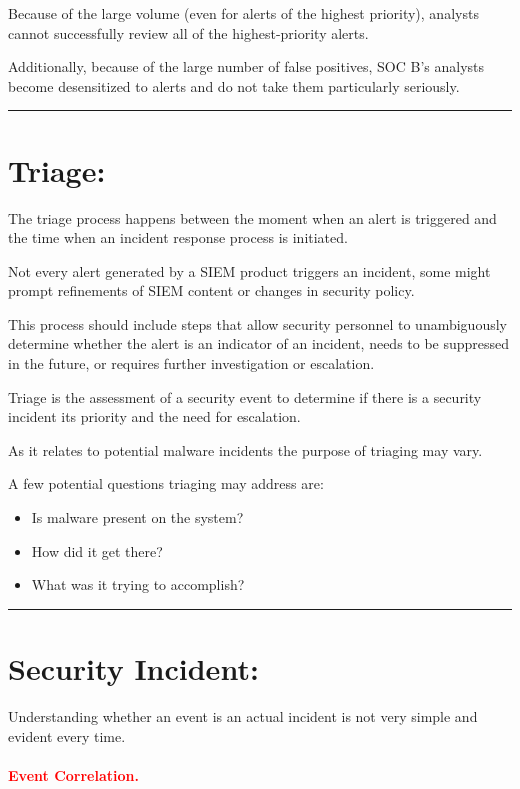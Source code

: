 \documentclass[british]{article}
\begin{document}
Because of the large volume (even for alerts of the highest priority),
analysts cannot successfully review all of the highest-priority alerts.

Additionally, because of the large number of false positives, SOC
B's analysts become desensitized to alerts and do not take them particularly
seriously.

\rule[0.5ex]{0.75\columnwidth}{1pt}

\section{Triage:}

The triage process happens between the moment when an alert is triggered
and the time when an incident response process is initiated.

Not every alert generated by a SIEM product triggers an incident,
some might prompt refinements of SIEM content or changes in security
policy.

This process should include steps that allow security personnel to
unambiguously determine whether the alert is an indicator of an incident,
needs to be suppressed in the future, or requires further investigation
or escalation.

Triage is the assessment of a security event to determine if there
is a security incident its priority and the need for escalation.

As it relates to potential malware incidents the purpose of triaging
may vary.

A few potential questions triaging may address are:
\begin{itemize}
\item Is malware present on the system? 
\item How did it get there? 
\item What was it trying to accomplish? 
\end{itemize}
\rule[0.5ex]{0.75\columnwidth}{1pt}

\section{Security Incident:}

Understanding whether an event is an actual incident is not very simple
and evident every time.

\paragraph{\textcolor{red}{Event Correlation.}}
\end{document}
